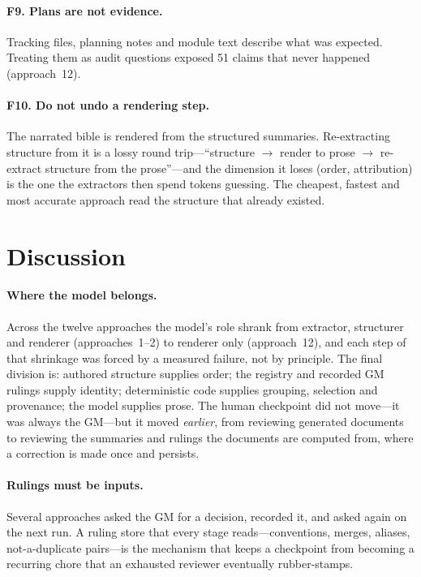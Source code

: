 \documentclass[11pt]{article}
\begin{document}
\paragraph{F9. Plans are not evidence.}
Tracking files, planning notes and module text describe what was expected. Treating them as audit
questions exposed 51 claims that never happened (approach~12).

\paragraph{F10. Do not undo a rendering step.}
The narrated bible is rendered from the structured summaries. Re-extracting structure from it is a
lossy round trip---``structure $\to$ render to prose $\to$ re-extract structure from the prose''---and
the dimension it loses (order, attribution) is the one the extractors then spend tokens guessing. The
cheapest, fastest and most accurate approach read the structure that already existed.

\section{Discussion}

\paragraph{Where the model belongs.}
Across the twelve approaches the model's role shrank from extractor, structurer and renderer
(approaches~1--2) to renderer only (approach~12), and each step of that shrinkage was forced by a
measured failure, not by principle. The final division is: authored structure supplies order; the
registry and recorded GM rulings supply identity; deterministic code supplies grouping, selection and
provenance; the model supplies prose. The human checkpoint did not move---it was always the GM---but
it moved \emph{earlier}, from reviewing generated documents to reviewing the summaries and rulings the
documents are computed from, where a correction is made once and persists.

\paragraph{Rulings must be inputs.}
Several approaches asked the GM for a decision, recorded it, and asked again on the next run. A
ruling store that every stage reads---conventions, merges, aliases, not-a-duplicate pairs---is the
mechanism that keeps a checkpoint from becoming a recurring chore that an exhausted reviewer
eventually rubber-stamps.
\end{document}
